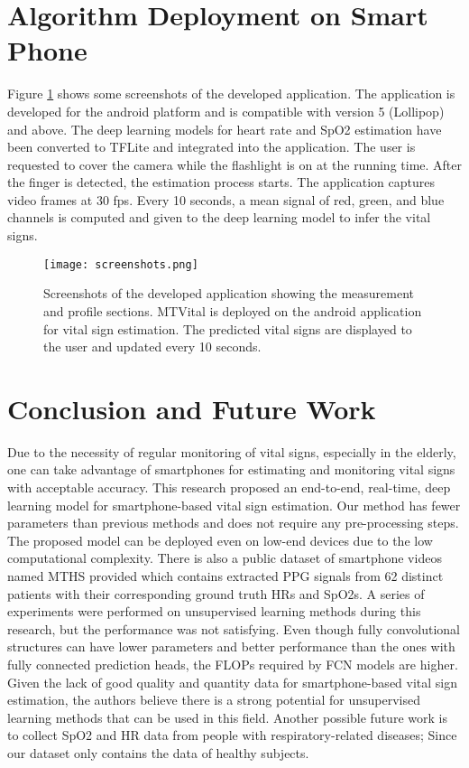\documentclass[conference]{IEEEtran}
\begin{document}
\section{Algorithm Deployment on Smart Phone}
Figure \ref{fig:application-screenshot} shows some screenshots of the developed application. The application is developed for the android platform and is compatible with version 5 (Lollipop) and above. The deep learning models for heart rate and SpO2 estimation have been converted to TFLite \cite{b17} and integrated into the application. The user is requested to cover the camera while the flashlight is on at the running time. After the finger is detected, the estimation process starts. The application captures video frames at 30 fps. Every 10 seconds, a mean signal of red, green, and blue channels is computed and given to the deep learning model to infer the vital signs.

\begin{figure}[htbp]
    \centering
    \texttt{[image: screenshots.png]}
    \caption{Screenshots of the developed application showing the measurement and profile sections. MTVital is deployed on the android application for vital sign estimation. The predicted vital signs are displayed to the user and updated every 10 seconds.}
    \label{fig:application-screenshot}
\end{figure}

\section{Conclusion and Future Work}
Due to the necessity of regular monitoring of vital signs, especially in the elderly, one can take advantage of smartphones for estimating and monitoring vital signs with acceptable accuracy. This research proposed an end-to-end, real-time, deep learning model for smartphone-based vital sign estimation. Our method has fewer parameters than previous methods and does not require any pre-processing steps. The proposed model can be deployed even on low-end devices due to the low computational complexity. There is also a public dataset of smartphone videos named MTHS provided which contains extracted PPG signals from 62 distinct patients with their corresponding ground truth HRs and SpO2s. A series of experiments were performed on unsupervised learning methods during this research, but the performance was not satisfying. Even though fully convolutional structures can have lower parameters and better performance than the ones with fully connected prediction heads, the FLOPs required by FCN models are higher. Given the lack of good quality and quantity data for smartphone-based vital sign estimation, the authors believe there is a strong potential for unsupervised learning methods that can be used in this field. Another possible future work is to collect SpO2 and HR data from people with respiratory-related diseases; Since our dataset only contains the data of healthy subjects.
\end{document}
